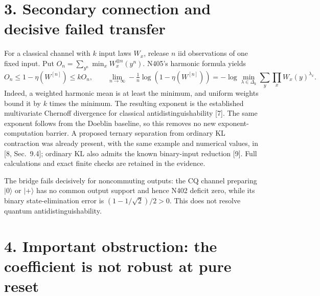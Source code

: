 \documentclass[10pt,a4paper]{article}
\begin{document}
\section*{3. Secondary connection and decisive failed transfer}

For a classical channel with $k$ input laws $W_x$, release $n$ iid observations of one fixed input. Put $O_n=\sum_{y^n}\min_x W_x^{\otimes n}(y^n)$. N405's harmonic formula yields
\[
 O_n\le1-\eta(W^{[n]})\le kO_n,
 \qquad \lim_{n\to\infty}-\tfrac1n\log(1-\eta(W^{[n]}))
 =-\log\min_{\lambda\in\Delta_k}\sum_y\prod_x W_x(y)^{\lambda_x}.
\]
Indeed, a weighted harmonic mean is at least the minimum, and uniform weights bound it by $k$ times the minimum. The resulting exponent is the established multivariate Chernoff divergence for classical antidistinguishability [7]. The same exponent follows from the Doeblin baseline, so this removes no new exponent-computation barrier. A proposed ternary separation from ordinary KL contraction was already present, with the same example and numerical values, in [8, Sec.~9.4]; ordinary KL also admits the known binary-input reduction [9]. Full calculations and exact finite checks are retained in the evidence.

The bridge fails decisively for noncommuting outputs: the CQ channel preparing $|0\rangle$ or $|+\rangle$ has no common output support and hence N402 deficit zero, while its binary state-elimination error is $(1-1/\sqrt2)/2>0$. This does not resolve quantum antidistinguishability.

\section*{4. Important obstruction: the coefficient is not robust at pure reset}
\end{document}
